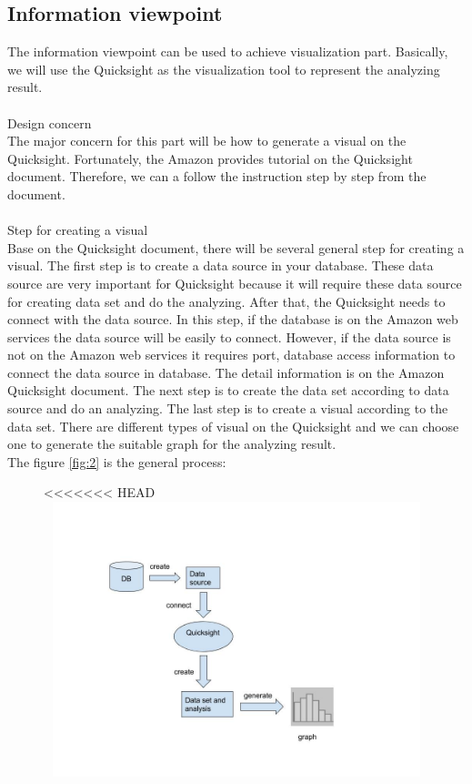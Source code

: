 {    \subsection{Information viewpoint}
    The information viewpoint can be used to achieve visualization part. Basically, we will use the Quicksight as the visualization tool to represent the analyzing result.\\
\\
    Design concern \\
    The major concern for this part will be how to generate a visual on the Quicksight. Fortunately, the Amazon provides tutorial on the Quicksight document. Therefore, we can a follow the instruction step by step from the document.\\
\\    
    Step for creating a visual\\
    Base on the Quicksight document, there will be several general step for creating a visual. The first step is to create a data source in your database. These data source are very important for Quicksight because it will require these data source for creating data set and do the analyzing. After that, the Quicksight needs to connect with the data source. In this step, if the database is on the Amazon web services the data source will be easily to connect. However, if the data source is not on the Amazon web services it requires port, database access information to connect the data source in database. The detail information is on the Amazon Quicksight document. The next step is to create the data set according to data source and do an analyzing. The last step is to create a visual according to the data set. There are different types of visual on the Quicksight and we can choose one to generate the suitable graph for the analyzing result.\cite{w4}\\
The figure \ref{fig:2} is the general process:
    \begin{figure}[h]
<<<<<<< HEAD
    \includegraphics[width=16cm, height=8cm]{4.jpg}

\end{figure}}
